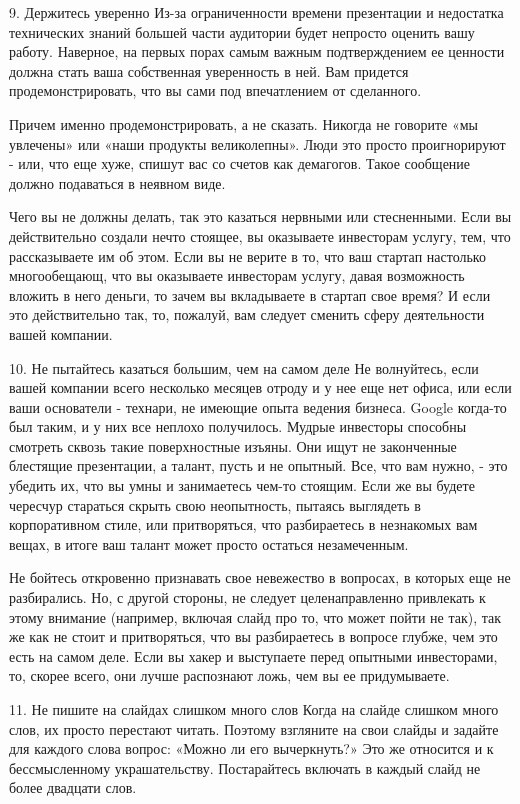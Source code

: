 \documentclass[ebook,12pt,oneside,openany]{memoir}
\begin{document}
9. Держитесь уверенно Из-за ограниченности времени презентации и
недостатка технических знаний большей части аудитории будет непросто
оценить вашу работу. Наверное, на первых порах самым важным
подтверждением ее ценности должна стать ваша собственная уверенность в
ней. Вам придется продемонстрировать, что вы сами под впечатлением от
сделанного.

Причем именно продемонстрировать, а не сказать. Никогда не говорите
«мы увлечены» или «наши продукты великолепны». Люди это просто
проигнорируют - или, что еще хуже, спишут вас со счетов как демагогов.
Такое сообщение должно подаваться в неявном виде.

Чего вы не должны делать, так это казаться нервными или стесненными.
Если вы действительно создали нечто стоящее, вы оказываете инвесторам
услугу, тем, что рассказываете им об этом. Если вы не верите в то, что
ваш стартап настолько многообещающ, что вы оказываете инвесторам
услугу, давая возможность вложить в него деньги, то зачем вы
вкладываете в стартап свое время? И если это действительно так, то,
пожалуй, вам следует сменить сферу деятельности вашей компании.

10. Не пытайтесь казаться большим, чем на самом деле Не волнуйтесь,
если вашей компании всего несколько месяцев отроду и у нее еще нет
офиса, или если ваши основатели - технари, не имеющие опыта ведения
бизнеса. Google когда-то был таким, и у них все неплохо получилось.
Мудрые инвесторы способны смотреть сквозь такие поверхностные изъяны.
Они ищут не законченные блестящие презентации, а талант, пусть и не
опытный. Все, что вам нужно, - это убедить их, что вы умны и
занимаетесь чем-то стоящим. Если же вы будете чересчур стараться
скрыть свою неопытность, пытаясь выглядеть в корпоративном стиле, или
притворяться, что разбираетесь в незнакомых вам вещах, в итоге ваш
талант может просто остаться незамеченным.

Не бойтесь откровенно признавать свое невежество в вопросах, в которых
еще не разбирались. Но, с другой стороны, не следует целенаправленно
привлекать к этому внимание (например, включая слайд про то, что может
пойти не так), так же как не стоит и притворяться, что вы разбираетесь
в вопросе глубже, чем это есть на самом деле. Если вы хакер и
выступаете перед опытными инвесторами, то, скорее всего, они лучше
распознают ложь, чем вы ее придумываете.

11. Не пишите на слайдах слишком много слов Когда на слайде слишком
много слов, их просто перестают читать. Поэтому взгляните на свои
слайды и задайте для каждого слова вопрос: «Можно ли его вычеркнуть?»
Это же относится и к бессмысленному украшательству. Постарайтесь
включать в каждый слайд не более двадцати слов.
\end{document}
